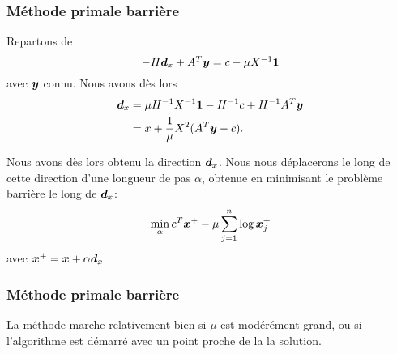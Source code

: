 \documentclass[usepdftitle=false, aspectratio=169]{beamer}
\begin{document}
\begin{frame}
\frametitle{Méthode primale barrière}

Repartons de
$$
-H{\boldsymbol{d}}_x + A^T{\boldsymbol{y}} = c - \mu X^{-1}{\boldsymbol{1}}
$$
avec ${\boldsymbol{y}}$ connu. Nous avons dès lors
\begin{align*}
{\boldsymbol{d}}_x &= \mu H^{-1}X^{-1}{\boldsymbol{1}} - H^{-1}c + H^{-1}A^T{\boldsymbol{y}} \\
&= x + \frac{1}{\mu}X^2(A^T{\boldsymbol{y}}-c).
\end{align*}

\mbox{}

Nous avons dès lors obtenu la direction ${\boldsymbol{d}}_x$.
Nous nous déplacerons le long de cette direction d'une longueur de pas $\alpha$, obtenue en minimisant le problème barrière le long de ${\boldsymbol{d}}_x$:
$$
\min_{\alpha} c^T{\boldsymbol{x}}^+ - \mu \sum_{j = 1}^n \log {\boldsymbol{x}}^+_j
$$
avec ${\boldsymbol{x}}^+ = {\boldsymbol{x}}+\alpha {\boldsymbol{d}}_x$




\end{frame}

\begin{frame}
\frametitle{Méthode primale barrière}

La méthode marche relativement bien si $\mu$ est modérément grand, ou si l'algorithme est démarré avec un point proche de la la solution.



\end{frame}
\end{document}
